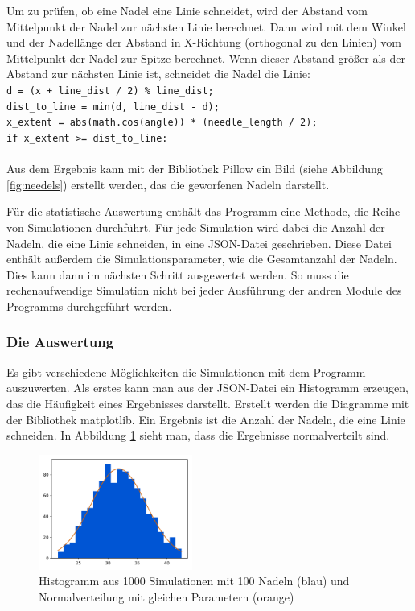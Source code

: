 \documentclass[10pt,twocolumn]{scrartcl}
\begin{document}
			Um zu prüfen, ob eine Nadel eine Linie schneidet, wird der Abstand vom Mittelpunkt der Nadel zur nächsten Linie berechnet. Dann wird mit dem Winkel und der Nadellänge der Abstand in X-Richtung (orthogonal zu den Linien) vom Mittelpunkt der Nadel zur Spitze berechnet. Wenn dieser Abstand größer als der Abstand zur nächsten Linie ist, schneidet die Nadel die Linie:\\
			\texttt{d = (x + line\_dist / 2) \% line\_dist;\\
				dist\_to\_line = min(d, line\_dist - d);\\
				x\_extent = abs(math.cos(angle)) * (needle\_length / 2);\\
				if x\_extent >= dist\_to\_line:}\\
			\\
			Aus dem Ergebnis kann mit der Bibliothek Pillow\cite{Pillow} ein Bild (siehe Abbildung \ref{fig:needels}) erstellt werden, das die geworfenen Nadeln darstellt.

			Für die statistische Auswertung enthält das Programm eine Methode, die Reihe von Simulationen durchführt. Für jede Simulation wird dabei die Anzahl der Nadeln, die eine Linie schneiden, in eine JSON-Datei geschrieben. Diese Datei enthält außerdem die Simulationsparameter, wie die Gesamtanzahl der Nadeln. Dies kann dann im nächsten Schritt ausgewertet werden. So muss die rechenaufwendige Simulation nicht bei jeder Ausführung der andren Module des Programms durchgeführt werden.

		\subsubsection*{Die Auswertung}
			Es gibt verschiedene Möglichkeiten die Simulationen mit dem Programm auszuwerten. Als erstes kann man aus der JSON-Datei ein Histogramm erzeugen, das die Häufigkeit eines Ergebnisses darstellt. Erstellt werden die Diagramme mit der Bibliothek matplotlib\cite{matplotlib}. Ein Ergebnis ist die Anzahl der Nadeln, die eine Linie schneiden. In Abbildung \ref{fig:hist} sieht man, dass die Ergebnisse normalverteilt sind.

			\begin{figure}[htb]
				\centering
				\includegraphics[width=0.45\textwidth]{images/histogram_1000_no_interval_3.png}
				\caption{Histogramm aus 1000 Simulationen mit 100 Nadeln (blau) und Normalverteilung mit gleichen Parametern (orange)}
				\label{fig:hist}
			\end{figure}
			
\end{document}
